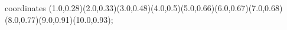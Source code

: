 					coordinates { (1.0,0.28)(2.0,0.33)(3.0,0.48)(4.0,0.5)(5.0,0.66)(6.0,0.67)(7.0,0.68)(8.0,0.77)(9.0,0.91)(10.0,0.93)};